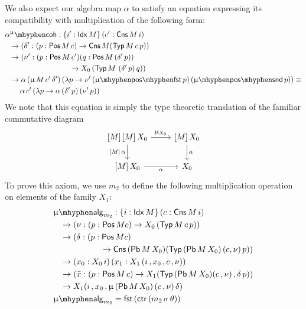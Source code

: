 We also expect our algebra map $\alpha$ to satisfy an equation
expressing its compatibility with multiplication of the following
form:
\begin{align*}
  &\alpha^{\upmu}\coh : \{i' : \Idx M\}\, (c' : \Cns M\, i)\\
  &\hspace{.2cm} \to (\delta' : (p : \Pos M\, c) \to \Cns M (\Typ M\, c\, p))\\
  &\hspace{.2cm} \to (\nu' : (p : \Pos M\, c') (q : \Pos M\, (\delta'\, p)) \\
  &\hspace{3cm} \to X_0\, (\Typ M\ (\delta'\, p)\, q)) \\
  &\hspace{.2cm} \to \alpha\, (\upmu\, M\, c' \, \delta')\, (\lambda p \to \nu'\, (\muposfst p)\, (\mupossnd p)) \equiv\\
  &\hspace{.7cm} \alpha\, c'\, (\lambda p \to \alpha\, (\delta'\, p)\, (\nu'\, p))
\end{align*}
We note that this equation is simply the type theoretic translation of
the familiar commutative diagram
\[
  \begin{tikzcd}
    {[ M ]\, [ M ]\, X_0} \ar[r,"\upmu_{X_0}"] \ar[d,"{[ M ]\, \alpha}"'] &
    {[ M ]\, X_0} \ar[d,"\alpha"] \\
    {[ M ]\, X_0} \ar[r,"\alpha"'] & X_0
  \end{tikzcd}
\]
To prove this axiom, we use $m_2$ to define the following
multiplication operation on elements of the family $X_1$:
\begin{align*}
  &\upmu\alg_{m_2} : \{i : \Idx M\}\, (c : \Cns M\, i)\\
  &\hspace{.3cm}\to (\nu : (p : \Pos M c) \to X_0\, (\Typ M\, c\, p)) \\
  &\hspace{.3cm}\to (\delta : (p : \Pos M c)\\
  &\hspace{2cm} \to  \Cns (\Pb M\, X_0) (\Typ (\Pb M\, X_0)\, (c, \nu)\, p)) \\
  &\hspace{.3cm}\to (x_0 : X_0\, i)\, (x_1 : X_1\, (i \,, x_0 \,, c \,, \nu)) \\
  &\hspace{.3cm}\to (\bar{x} : (p : \Pos M\, c) \to X_1 (\Typ (\Pb M\, X_0) (c \,, \nu) \,, \delta\, p)) \\
  &\hspace{.3cm}\to X_1 (i \,, x_0 \,, \upmu\, (\Pb M\, X_0)\, (c \,, \nu)\, \delta) \\
  &\upmu\alg_{m_2} = \fst (\ctr (m_2\, \sigma\, \theta))
\end{align*}
